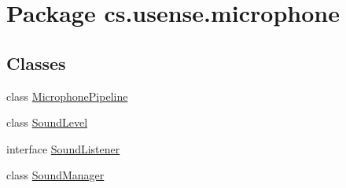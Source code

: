 \hypertarget{namespacecs_1_1usense_1_1microphone}{}\section{Package cs.\+usense.\+microphone}
\label{namespacecs_1_1usense_1_1microphone}
\subsection*{Classes}
\begin{DoxyCompactItemize}
\item 
class \hyperlink{classcs_1_1usense_1_1microphone_1_1_microphone_pipeline}{Microphone\+Pipeline}
\item 
class \hyperlink{classcs_1_1usense_1_1microphone_1_1_sound_level}{Sound\+Level}
\item 
interface \hyperlink{interfacecs_1_1usense_1_1microphone_1_1_sound_listener}{Sound\+Listener}
\item 
class \hyperlink{classcs_1_1usense_1_1microphone_1_1_sound_manager}{Sound\+Manager}
\end{DoxyCompactItemize}


